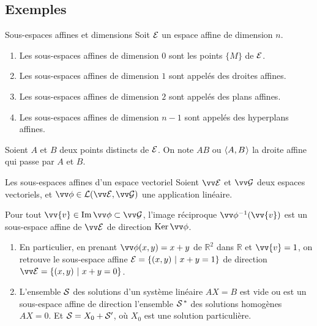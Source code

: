 \documentclass{m53beamer}
\begin{document}
\subsection{Exemples}
  \begin{frame}{Sous-espaces affines et dimensions}
    Soit $\mathcal{E}$ un espace affine de dimension $n$.
    \begin{enumerate}[<+(1)->]
      \item Les sous-espaces affines de dimension $0$ sont les points $\{M\}$ de $\mathcal{E}$.
      \item Les sous-espaces affines de dimension $1$ sont appelés \alert{des droites affines}.
      \item Les sous-espaces affines de dimension $2$ sont appelés \alert{des plans affines}.
      \item Les sous-espaces affines de dimension $n-1$ sont appelés \alert{des hyperplans affines}.
    \end{enumerate}\pause

    Soient $A$ et $B$ deux points distincts de $\mathcal{E}$. On note $AB$ ou $\langle{A,B}\kern.07em\rangle$ la droite affine qui passe par $A$ et $B$.
  \end{frame}
  \begin{frame}{Les sous-espaces affines d'un espace vectoriel}
    Soient $\ev{E}$ et $\ev{G}$ deux espaces vectoriels, et $\vv\phi \in \lin(\ev{E},\ev{G})$ une application linéaire.\pause\\
    \begin{proposition}
      Pour tout $\vv{v}\in\im\vv\phi\subset\ev{G}$, l'image réciproque $\vv\phi^{-1}(\vv{v})$ est un sous-espace affine de $\ev{E}$ de direction $\ker{\vv\phi}$.
    \end{proposition}
    \begin{enumerate}[<+(1)->]
      \item En particulier, en prenant $\vv\phi(x,y)=x+y$ de $\mathbb{R}^{2}$ dans $\mathbb{R}$ et $\vv{v}=1$, on retrouve le sous-espace affine $\mathcal{E}=\{(x,y)\ |\ x+y=1 \}$ de direction $\ev{E}=\{(x,y)\ |\ x+y=0 \}$.
      \item L'ensemble $\mathcal{S}$ des solutions d'un système linéaire $AX=B$ est vide ou est un sous-espace affine de direction l'ensemble $\mathcal{S^{\,\ast}}$ des solutions homogènes $AX=0$. Et $\mathcal{S}=X_{0}+\mathcal{S}'$, où $X_{0}$ est une solution particulière.
    \end{enumerate}
  \end{frame}
\end{document}
